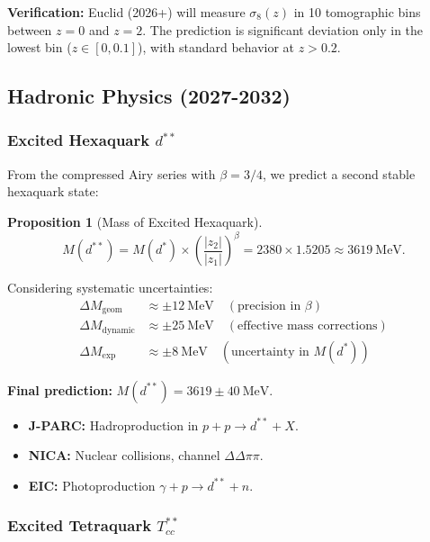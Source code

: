 \documentclass[11pt, a4paper]{article}
\theoremstyle{plain}
\newtheorem{proposition}[theorem]{Proposition}
\theoremstyle{definition}
\begin{document}
\textbf{Verification:} Euclid (2026+) will measure $\sigma_8(z)$ in 10 tomographic bins between $z=0$ and $z=2$. The prediction is significant deviation only in the lowest bin ($z \in [0, 0.1]$), with standard behavior at $z > 0.2$.

\subsection{Hadronic Physics (2027-2032)}

\subsubsection{Excited Hexaquark \texorpdfstring{$d^{**}$}{d**}}

From the compressed Airy series with $\beta = 3/4$, we predict a second stable hexaquark state:

\begin{proposition}[Mass of Excited Hexaquark]
\begin{equation}
M(d^{**}) = M(d^*) \times \left(\frac{|z_2|}{|z_1|}\right)^\beta = 2380 \times 1.5205 \approx 3619\ \si{\mega\electronvolt}.
\end{equation}
\end{proposition}

Considering systematic uncertainties:
\begin{align*}
\Delta M_{\text{geom}} &\approx \pm 12\ \si{\mega\electronvolt} \quad (\text{precision in } \beta) \\
\Delta M_{\text{dynamic}} &\approx \pm 25\ \si{\mega\electronvolt} \quad (\text{effective mass corrections}) \\
\Delta M_{\text{exp}} &\approx \pm 8\ \si{\mega\electronvolt} \quad (\text{uncertainty in } M(d^*))
\end{align*}

\textbf{Final prediction:} $M(d^{**}) = 3619 \pm 40\ \si{\mega\electronvolt}$.

\begin{itemize}
    \item \textbf{J-PARC:} Hadroproduction in $p + p \to d^{**} + X$.
    \item \textbf{NICA:} Nuclear collisions, channel $\Delta\Delta\pi\pi$.
    \item \textbf{EIC:} Photoproduction $\gamma + p \to d^{**} + n$.
\end{itemize}

\subsubsection{Excited Tetraquark \texorpdfstring{$T_{cc}^{**}$}{Tcc**}}
\end{document}
